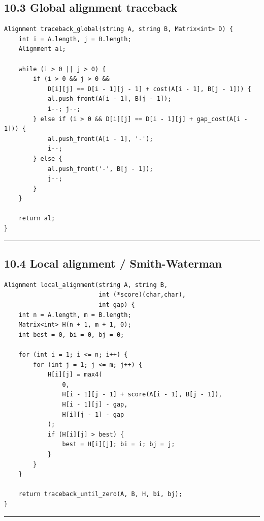 \documentclass[11pt]{article}
\begin{document}
\subsection{10.3 Global alignment traceback}\label{global-alignment-traceback}

\begin{verbatim}
Alignment traceback_global(string A, string B, Matrix<int> D) {
    int i = A.length, j = B.length;
    Alignment al;

    while (i > 0 || j > 0) {
        if (i > 0 && j > 0 &&
            D[i][j] == D[i - 1][j - 1] + cost(A[i - 1], B[j - 1])) {
            al.push_front(A[i - 1], B[j - 1]);
            i--; j--;
        } else if (i > 0 && D[i][j] == D[i - 1][j] + gap_cost(A[i - 1])) {
            al.push_front(A[i - 1], '-');
            i--;
        } else {
            al.push_front('-', B[j - 1]);
            j--;
        }
    }

    return al;
}
\end{verbatim}

\begin{center}\rule{0.5\linewidth}{0.5pt}\end{center}

\subsection{10.4 Local alignment / Smith-Waterman}\label{local-alignment-smith-waterman}

\begin{verbatim}
Alignment local_alignment(string A, string B,
                          int (*score)(char,char),
                          int gap) {
    int n = A.length, m = B.length;
    Matrix<int> H(n + 1, m + 1, 0);
    int best = 0, bi = 0, bj = 0;

    for (int i = 1; i <= n; i++) {
        for (int j = 1; j <= m; j++) {
            H[i][j] = max4(
                0,
                H[i - 1][j - 1] + score(A[i - 1], B[j - 1]),
                H[i - 1][j] - gap,
                H[i][j - 1] - gap
            );
            if (H[i][j] > best) {
                best = H[i][j]; bi = i; bj = j;
            }
        }
    }

    return traceback_until_zero(A, B, H, bi, bj);
}
\end{verbatim}

\begin{center}\rule{0.5\linewidth}{0.5pt}\end{center}
\end{document}
